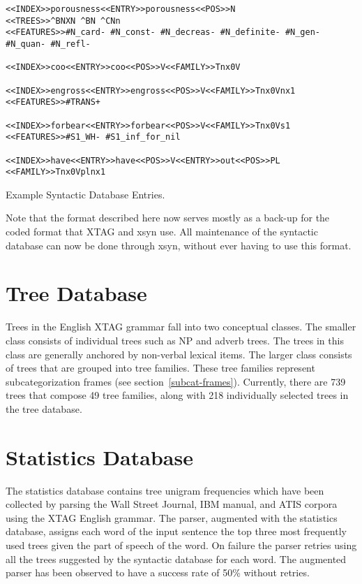 {\begin{table}[htb]
\begin{verbatim}
<<INDEX>>porousness<<ENTRY>>porousness<<POS>>N
<<TREES>>^BNXN ^BN ^CNn
<<FEATURES>>#N_card- #N_const- #N_decreas- #N_definite- #N_gen- 
#N_quan- #N_refl-

<<INDEX>>coo<<ENTRY>>coo<<POS>>V<<FAMILY>>Tnx0V

<<INDEX>>engross<<ENTRY>>engross<<POS>>V<<FAMILY>>Tnx0Vnx1
<<FEATURES>>#TRANS+

<<INDEX>>forbear<<ENTRY>>forbear<<POS>>V<<FAMILY>>Tnx0Vs1
<<FEATURES>>#S1_WH- #S1_inf_for_nil

<<INDEX>>have<<ENTRY>>have<<POS>>V<<ENTRY>>out<<POS>>PL
<<FAMILY>>Tnx0Vplnx1
\end{verbatim}   
\caption{Example Syntactic Database Entries.}

\label{syn-entries}
\end{table}

Note that the format described here now serves mostly as a back-up for
the coded format that XTAG and xsyn use. All maintenance of the syntactic 
database can now be done through xsyn, without ever having to use this
format.  

\section{Tree Database} 
\label{tree-db}

Trees in the English XTAG grammar fall into two conceptual classes.
The smaller class consists of individual trees such as NP and adverb
trees.  The trees in this class are generally anchored by non-verbal
lexical items. The larger class consists of trees that are grouped
into tree families.  These tree families represent subcategorization
frames (see section~\ref{subcat-frames}).  Currently, there are 739
trees that compose 49 tree families, along with 218 individually
selected trees in the tree database.


\section{Statistics Database}
\label{stat-db}
The statistics database contains tree unigram frequencies which have been
collected by parsing the Wall Street Journal, IBM manual, and ATIS corpora
using the XTAG English grammar. The parser, augmented with the statistics
database, assigns each word of the input sentence the top three most frequently
used trees given the part of speech of the word. On failure the parser retries
using all the trees suggested by the syntactic database for each word.  The
augmented parser has been observed to have a success rate of 50\% without
retries.

}
